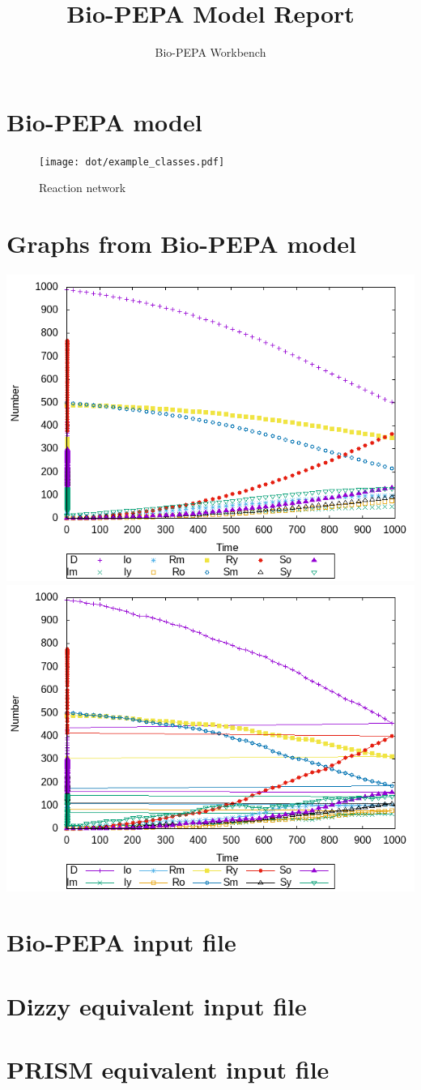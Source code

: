 \documentclass{llncs}
\title{Bio-PEPA Model Report}
\author{Bio-PEPA Workbench}
\institute{\today}
\begin{document}
\maketitle
\section{Bio-PEPA model}

\begin{figure}[htbp]
\begin{center}
\texttt{[image: dot/example\_classes.pdf]}
\caption{Reaction network}
\end{center}
\end{figure}
\newpage
\section{Graphs from Bio-PEPA model}
\includegraphics[scale=0.5]{png/example_classes001_dizzy_results_0}
\hfill
\includegraphics[scale=0.5]{png/example_classes001_dizzy_results_1}
\appendix
\newpage
\section{Bio-PEPA input file}

\newpage
\section{Dizzy equivalent input file}

\newpage
\section{PRISM equivalent input file}

\end{document}
